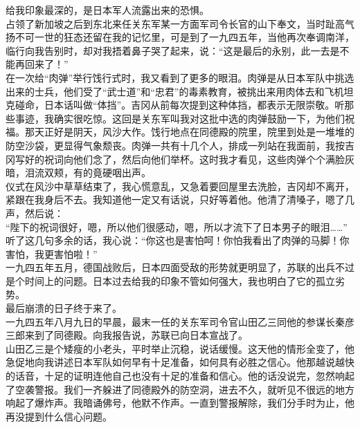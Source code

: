 给我印象最深的，是日本军人流露出来的恐惧。\\

占领了新加坡之后到东北来任关东军某一方面军司令长官的山下奉文，当时趾高气扬不可一世的狂态还留在我的记忆里，可是到了一九四五年，当他再次奉调南洋，临行向我告别时，却对我捂着鼻子哭了起来，说：“这是最后的永别，此一去是不能再回来了！”\\

在一次给“肉弹”举行饯行式时，我又看到了更多的眼泪。肉弹是从日本军队中挑选出来的士兵，他们受了“武士道”和“忠君”的毒素教育，被挑出来用肉体去和飞机坦克碰命，日本话叫做“体挡”。吉冈从前每次提到这种体挡，都表示无限崇敬。听那些事迹，我确实很吃惊。这回是关东军叫我对这批中选的肉弹鼓励一下，为他们祝福。那天正好是阴天，风沙大作。饯行地点在同德殿的院里，院里到处是一堆堆的防空沙袋，更显得气象颓丧。肉弹一共有十几个人，排成一列站在我面前，我按吉冈写好的祝词向他们念了，然后向他们举杯。这时我才看见，这些肉弹个个满脸灰暗，泪流双颊，有的竟硬咽出声。\\

仪式在风沙中草草结束了，我心慌意乱，又急着要回屋里去洗脸，吉冈却不离开，紧跟在我身后不去。我知道他一定又有话说，只好等着他。他清了清嗓子，嗯了几声，然后说：\\

“陛下的祝词很好，嗯，所以他们很感动，嗯，所以才流下了日本男子的眼泪……”\\

听了这几句多余的话，我心说：“你这也是害怕呵！你怕我看出了肉弹的马脚！你害怕，我更害怕啦！”\\

一九四五年五月，德国战败后，日本四面受敌的形势就更明显了，苏联的出兵不过是个时间上的问题。日本过去给我的印象不管如何强大，我也明白了它的孤立劣势。\\

最后崩溃的日子终于来了。\\

一九四五年八月九日的早晨，最末一任的关东军司令官山田乙三同他的参谋长秦彦三郎来到了同德殿。向我报告说，苏联已向日本宣战了。\\

山田乙三是个矮瘦的小老头，平时举止沉稳，说话缓慢。这天他的情形全变了，他急促地向我讲述日本军队如何早有十足准备，如何具有必胜之信心。他那越说越快的话音，十足的证明连他自己也没有十足的准备和信心。他的话没说完，忽然响起了空袭警报。我们一齐躲进了同德殿外的防空洞，进去不久，就听见不很远的地方响起了爆炸声。我暗诵佛号，他默不作声。一直到警报解除，我们分手时为止，他再没提到什么信心问题。\\

